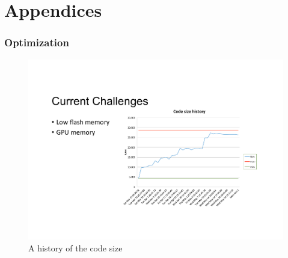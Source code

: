 \documentclass[12pt]{report}
\begin{document}
\newpage
\chapter{Appendices}


\subsection*{Optimization}
\begin{figure}[h]
  \centering
  \includegraphics[scale=1]{Figures/CodeSizeChart}
  \caption{A history of the code size}
  \label{fig:code_size}
\end{figure}
\newpage
\end{document}
